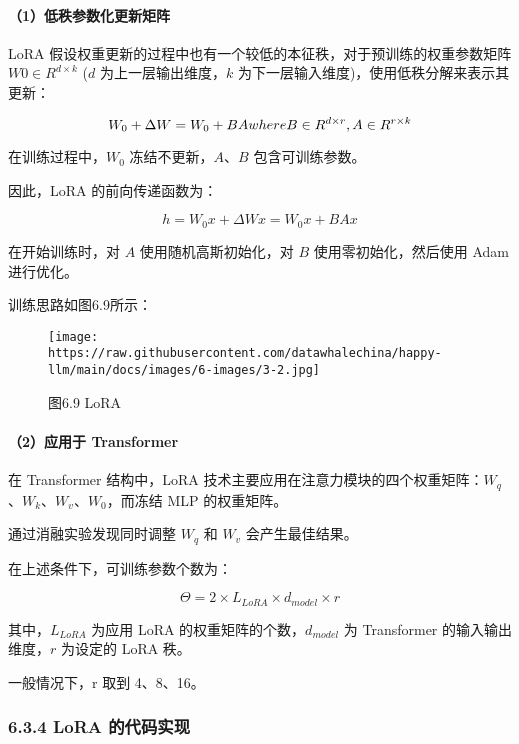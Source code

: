 \documentclass[
]{article}
\begin{document}
\paragraph{（1）低秩参数化更新矩阵}\label{ux4f4eux79e9ux53c2ux6570ux5316ux66f4ux65b0ux77e9ux9635}

LoRA 假设权重更新的过程中也有一个较低的本征秩，对于预训练的权重参数矩阵
\(W0 \in R^{d \times k}\) (\(d\) 为上一层输出维度，\(k\)
为下一层输入维度)，使用低秩分解来表示其更新：

\[W_0 + {\Delta}W = W_0 + BA \space\space  where \space B \in R^{d \times r}, A \in R^{r \times k}\]

在训练过程中，\(W_0\) 冻结不更新，\(A\)、\(B\) 包含可训练参数。

因此，LoRA 的前向传递函数为：

\[h = W_0 x + \Delta W x = W_0 x + B A x\]

在开始训练时，对 \(A\) 使用随机高斯初始化，对 \(B\)
使用零初始化，然后使用 Adam 进行优化。

训练思路如图6.9所示：

\begin{figure}[htbp]\centering
\texttt{[image: https://raw.githubusercontent.com/datawhalechina/happy-llm/main/docs/images/6-images/3-2.jpg]}
\caption{图6.9 LoRA}
\end{figure}

\paragraph{（2）应用于
Transformer}\label{ux5e94ux7528ux4e8e-transformer}

在 Transformer 结构中，LoRA
技术主要应用在注意力模块的四个权重矩阵：\(W_q\)、\(W_k\)、\(W_v\)、\(W_0\)，而冻结
MLP 的权重矩阵。

通过消融实验发现同时调整 \(W_q\) 和 \(W_v\) 会产生最佳结果。

在上述条件下，可训练参数个数为：

\[\Theta = 2 \times L_{LoRA} \times d_{model} \times r\]

其中，\(L_{LoRA}\) 为应用 LoRA 的权重矩阵的个数，\(d_{model}\) 为
Transformer 的输入输出维度，\(r\) 为设定的 LoRA 秩。

一般情况下，r 取到 4、8、16。

\subsubsection{6.3.4 LoRA
的代码实现}\label{lora-ux7684ux4ee3ux7801ux5b9eux73b0}
\end{document}

